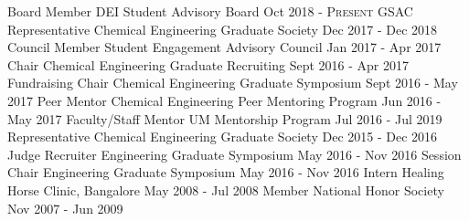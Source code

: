 

\begin{cventries}

  \cventry
    {Board Member}
    {DEI Student Advisory Board}
    {}
    {Oct 2018 - \textsc{Present}}
    {}
  \cventry
    {GSAC Representative}
    {Chemical Engineering Graduate Society}
    {}
    {Dec 2017 - Dec 2018}
    {}
  \cventry
    {Council Member}
    {Student Engagement Advisory Council}
    {}
    {Jan 2017 - Apr 2017}
    {}
  \cventry
    {Chair}
    {Chemical Engineering Graduate Recruiting}
    {}
    {Sept 2016 - Apr 2017}
    {}
  \cventry
    {Fundraising Chair}
    {Chemical Engineering Graduate Symposium}
    {}
    {Sept 2016 - May 2017}
    {}
  \cventry
    {Peer Mentor}
    {Chemical Engineering Peer Mentoring Program}
    {}
    {Jun 2016 - May 2017}
    {}
  \cventry
    {Faculty/Staff Mentor}
    {UM Mentorship Program}
    {}
    {Jul 2016 - Jul 2019}
    {}
  \cventry
    {Representative}
    {Chemical Engineering Graduate Society}
    {}
    {Dec 2015 - Dec 2016}
    {}
  \cventry
    {Judge Recruiter}
    {Engineering Graduate Symposium}
    {}
    {May 2016 - Nov 2016}
    {}
  \cventry
    {Session Chair}
    {Engineering Graduate Symposium}
    {}
    {May 2016 - Nov 2016}
    {}
\ifoutdated
  \cventry
    {Intern}
    {Healing Horse Clinic, Bangalore}
    {}
    {May 2008 - Jul 2008}
    {}
  \cventry
    {Member}
    {National Honor Society}
    {}
    {Nov 2007 - Jun 2009}
    {}
\fi
\end{cventries}
